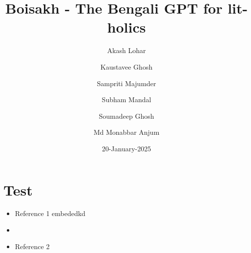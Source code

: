 \documentclass[12pt, a4paper]{article}
\title{Boisakh - The Bengali GPT for lit-holics}
\author{
    Akash Lohar \and
    Kaustavee Ghosh \and
    Sampriti Majumder \and
    Subham Mandal \and
    Soumadeep Ghosh \and
    Md Monabbar Anjum
}
\date{20-January-2025}
\begin{document}
\maketitle
\pagebreak
{}

\doublespace %
\tableofcontents
\singlespace %
\begin{appendix}
    \listoffigures
    \listoftables
\end{appendix}
\pagebreak













\section{Test}
\begin{itemize}
    \item Reference 1 \cite{NLPTranslation:1} embededkd \cite{BengaliMT:1}
    \item \cite{AWSRNN:1}
    \item Reference 2
\end{itemize}

\newpage
{}


\end{document}
